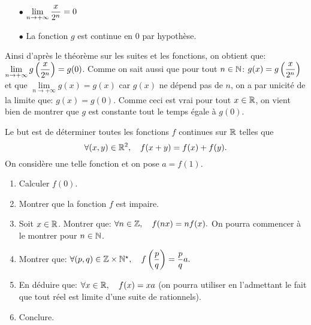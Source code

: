 \documentclass[a4paper, 11pt,reqno]{article}
\begin{document}
\begin{correction}
\begin{enumerate}
		      \begin{itemize}
			      \item[$\bullet$] $\lim\limits_{n\to +\infty} \displaystyle\frac{x}{2^n}=0$
			      \item[$\bullet$] La fonction $g$ est continue en 0 par hypoth\`{e}se.
		      \end{itemize}
		      Ainsi d'apr\`{e}s le th\'eor\`{e}me sur les suites et les fonctions, on obtient que: $\lim\limits_{n\to +\infty} g\left(\displaystyle\frac{x}{2^{n}} \right)=g(0)$. Comme on sait aussi que pour tout $n\in\mathbb{N}$: $g(x)=g\left(\displaystyle\frac{x}{2^{n}} \right)$ et que $\lim\limits_{n\to +\infty} g(x)=g(x)$ car $g(x)$ ne d\'epend pas de $n$, on a par unicit\'e de la limite que: $g(x)=g(0)$. Comme ceci est vrai pour tout $x\in\mathbb{R}$, on vient bien de montrer que $g$ est constante tout le temps \'egale \`{a} $g(0)$.
	\end{enumerate}
\end{correction}
\begin{exercice}  \;
	Le but est de d\'eterminer toutes les fonctions $f$ continues sur $\mathbb{R}$ telles que
	$$\forall (x,y)\in\mathbb{R}^2,\quad f(x+y)=f(x)+f(y).$$
	On consid\`ere une telle fonction et on pose $a=f(1)$.
	\begin{enumerate}
		\item Calculer $f(0)$.
		\item Montrer que la fonction $f$ est impaire.
		\item Soit $x\in\mathbb{R}$. Montrer que: $\forall n\in\mathbb{Z},\quad f(nx)=nf(x).$ On pourra commencer \`{a} le montrer pour $n\in\mathbb{N}$.
		\item Montrer que: $\forall (p,q)\in\mathbb{Z}\times \mathbb{N}^{\star},\quad f\left( \displaystyle\frac{p}{q}\right)=\displaystyle\frac{p}{q}a.$
		\item En d\'eduire que: $\forall x\in\mathbb{R},\quad f(x)=xa$ (on pourra utiliser en l'admettant le fait que tout r\'eel est limite d'une suite de rationnels).
		\item Conclure.
	\end{enumerate}
\end{exercice}
\end{document}
